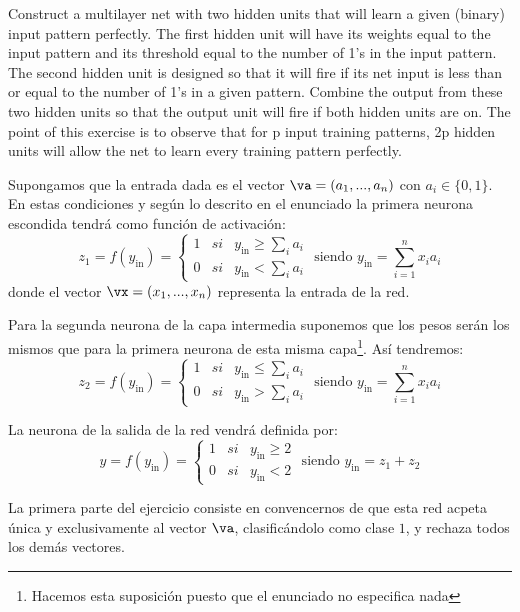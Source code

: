 \begin{problem}[17]
Construct a multilayer net with two hidden units that will learn a given (binary) input pattern perfectly. The first hidden unit will have its weights equal to the input pattern and its threshold equal to the number of 1's in the input pattern. The second hidden unit is designed so that it will fire if its net input is less than or equal to the number of 1's in a given pattern. Combine the output from these two hidden units so that the output unit will fire if both hidden units are on. The point of this exercise is to observe that for p input training patterns, 2p hidden units will allow the net to learn every training pattern perfectly.

\solution

Supongamos que la entrada dada es el vector $\va=(a_1,...,a_n)$ con $a_i\in\{0,1\}$. En estas condiciones y según lo descrito en el enunciado la primera neurona escondida tendrá como función de activación:
\[z_1=f(y_{\text{in}})=\left\{\begin{array}{lll}
1 & si & y_{\text{in}} \geq \sum_i a_i \\
0 & si & y_{\text{in}} < \sum_i a_i
\end{array}\right. \text{ siendo } y_{\text{in}} = \sum_{i=1}^nx_ia_i\]
donde el vector $\vx=(x_1,...,x_n)$ representa la entrada de la red.

Para la segunda neurona de la capa intermedia suponemos que los pesos serán los mismos que para la primera neurona de esta misma capa\footnote{Hacemos esta suposición puesto que el enunciado no especifica nada}. Así tendremos:
\[z_2=f(y_{\text{in}})=\left\{\begin{array}{lll}
1 & si & y_{\text{in}} \leq \sum_i a_i \\
0 & si & y_{\text{in}} > \sum_i a_i
\end{array}\right. \text{ siendo } y_{\text{in}} = \sum_{i=1}^nx_ia_i\]

La neurona de la salida de la red vendrá definida por:
\[y=f(y_{\text{in}})=\left\{\begin{array}{lll}
1 & si & y_{\text{in}} \geq 2 \\
0 & si & y_{\text{in}} < 2
\end{array}\right. \text{ siendo } y_{\text{in}} = z_1+z_2\]

La primera parte del ejercicio consiste en convencernos de que esta red acpeta única y exclusivamente al vector $\va$, clasificándolo como clase $1$, y rechaza todos los demás vectores.


\end{problem}
